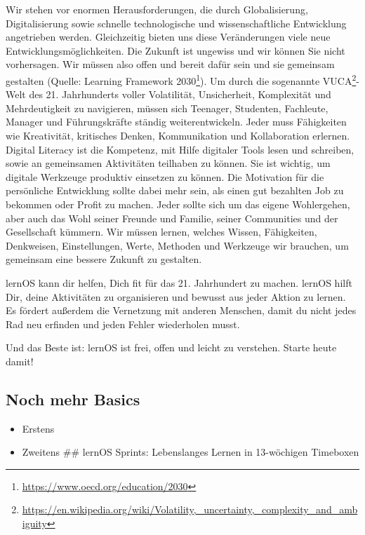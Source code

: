 \documentclass[
  ngerman,
  paper=a4,
,captions=tableheading
]{scrartcl}
\DeclareRobustCommand{\href}[2]{#2\footnote{\url{#1}}}
\providecommand{\tightlist}{%
  \setlength{\itemsep}{0pt}\setlength{\parskip}{0pt}}
\begin{document}
Wir stehen vor enormen Herausforderungen, die durch Globalisierung,
Digitalisierung sowie schnelle technologische und wissenschaftliche
Entwicklung angetrieben werden. Gleichzeitig bieten uns diese
Veränderungen viele neue Entwicklungsmöglichkeiten. Die Zukunft ist
ungewiss und wir können Sie nicht vorhersagen. Wir müssen also offen und
bereit dafür sein und sie gemeinsam gestalten (Quelle:
\href{https://www.oecd.org/education/2030}{Learning Framework 2030}). Um
durch die sogenannte
\href{https://en.wikipedia.org/wiki/Volatility,_uncertainty,_complexity_and_ambiguity}{VUCA}-Welt
des 21. Jahrhunderts voller Volatilität, Unsicherheit, Komplexität und
Mehrdeutigkeit zu navigieren, müssen sich Teenager, Studenten,
Fachleute, Manager und Führungskräfte ständig weiterentwickeln. Jeder
muss Fähigkeiten wie Kreativität, kritisches Denken, Kommunikation und
Kollaboration erlernen. Digital Literacy ist die Kompetenz, mit Hilfe
digitaler Tools lesen und schreiben, sowie an gemeinsamen Aktivitäten
teilhaben zu können. Sie ist wichtig, um digitale Werkzeuge produktiv
einsetzen zu können. Die Motivation für die persönliche Entwicklung
sollte dabei mehr sein, als einen gut bezahlten Job zu bekommen oder
Profit zu machen. Jeder sollte sich um das eigene Wohlergehen, aber auch
das Wohl seiner Freunde und Familie, seiner Communities und der
Gesellschaft kümmern. Wir müssen lernen, welches Wissen, Fähigkeiten,
Denkweisen, Einstellungen, Werte, Methoden und Werkzeuge wir brauchen,
um gemeinsam eine bessere Zukunft zu gestalten.

lernOS kann dir helfen, Dich fit für das 21. Jahrhundert zu machen.
lernOS hilft Dir, deine Aktivitäten zu organisieren und bewusst aus
jeder Aktion zu lernen. Es fördert außerdem die Vernetzung mit anderen
Menschen, damit du nicht jedes Rad neu erfinden und jeden Fehler
wiederholen musst.

Und das Beste ist: lernOS ist frei, offen und leicht zu verstehen.
Starte heute damit!

\hypertarget{noch-mehr-basics}{%
\subsection{Noch mehr Basics}\label{noch-mehr-basics}}

\begin{itemize}
\tightlist
\item
  Erstens
\item
  Zweitens \#\# lernOS Sprints: Lebenslanges Lernen in 13-wöchigen
  Timeboxen
\end{itemize}
\end{document}
